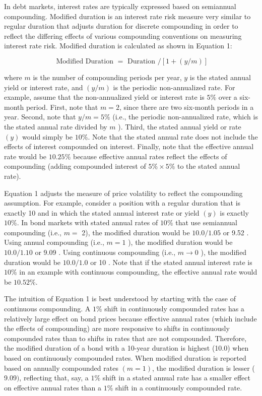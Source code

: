 \documentclass[11pt]{article}
\begin{document}
In debt markets, interest rates are typically expressed based on semiannual compounding. Modified duration is an interest rate risk measure very similar to regular duration that adjusts duration for discrete compounding in order to reflect the differing effects of various compounding conventions on measuring interest rate risk. Modified duration is calculated as shown in Equation 1:


\begin{equation*}
\text { Modified Duration }=\text { Duration } /[1+(y / m)] \tag{1}
\end{equation*}


where $m$ is the number of compounding periods per year, $y$ is the stated annual yield or interest rate, and $(y / m)$ is the periodic non-annualized rate. For example, assume that the non-annualized yield or interest rate is $5 \%$ over a six-month period. First, note that $m=2$, since there are two six-month periods in a year. Second, note that $y / m=5 \%$ (i.e., the periodic non-annualized rate, which is the stated annual rate divided by $m$ ). Third, the stated annual yield or rate $(y)$ would simply be $10 \%$. Note that the stated annual rate does not include the effects of interest compounded on interest. Finally, note that the effective annual rate would be $10.25 \%$ because effective annual rates reflect the effects of compounding (adding compounded interest of $5 \% \times 5 \%$ to the stated annual rate).

Equation 1 adjusts the measure of price volatility to reflect the compounding assumption. For example, consider a position with a regular duration that is exactly 10 and in which the stated annual interest rate or yield $(y)$ is exactly $10 \%$. In bond markets with stated annual rates of $10 \%$ that use semiannual compounding (i.e., $m=$ 2), the modified duration would be $10.0 / 1.05$ or 9.52 . Using annual compounding (i.e., $m=1$ ), the modified duration would be $10.0 / 1.10$ or 9.09 . Using continuous compounding (i.e., $m \rightarrow 0$ ), the modified duration would be $10.0 / 1.0$ or 10 . Note that if the stated annual interest rate is $10 \%$ in an example with continuous compounding, the effective annual rate would be $10.52 \%$.

The intuition of Equation 1 is best understood by starting with the case of continuous compounding. A $1 \%$ shift in continuously compounded rates has a relatively large effect on bond prices because effective annual rates (which include the effects of compounding) are more responsive to shifts in continuously compounded rates than to shifts in rates that are not compounded. Therefore, the modified duration of a bond with a 10-year duration is highest (10.0) when based on continuously compounded rates. When modified duration is reported based on annually compounded rates $(m=1)$, the modified duration is lesser ( 9.09$)$, reflecting that, say, a $1 \%$ shift in a stated annual rate has a smaller effect on effective annual rates than a $1 \%$ shift in a continuously compounded rate.
\end{document}
